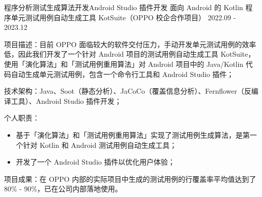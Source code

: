 \begin{cventries}
  \cventry
    {程序分析{\enskip\cdotp\enskip}测试生成算法开发{\enskip\cdotp\enskip}Android Studio 插件开发} %
    {面向 Android 的 Kotlin 程序单元测试用例自动生成工具 KotSuite（OPPO 校企合作项目）} %
    {2022.09 - 2023.12} %
    {} %
    {
      \begin{cvitems} %
        \item {项目描述：目前 OPPO 面临较大的软件交付压力，手动开发单元测试用例的效率低，因此我们开发了一个针对 Android 项目的测试用例自动生成工具 KotSuite，使用「演化算法」和「测试用例重用算法」对 Android 项目中的 Java/Kotlin 代码自动生成单元测试用例，包含一个命令行工具和 Android Studio 插件；}
        \item {技术架构：Java、Soot（静态分析）、JaCoCo（覆盖信息分析）、Fernflower（反编译工具）、Android Studio 插件开发；}
        \item {个人职责：}
          \begin{itemize}
            \item {基于「演化算法」和「测试用例重用算法」实现了测试用例生成算法，是第一个针对 Kotlin 和 Android 测试用例自动生成工具；}
            \item {开发了一个 Android Studio 插件以优化用户体验；}
          \end{itemize}
        \item {项目成果：在 OPPO 内部的实际项目中生成的测试用例的行覆盖率平均值达到了 80\% - 90\%，已在公司内部落地使用。}
      \end{cvitems}
    }


\end{cventries}
